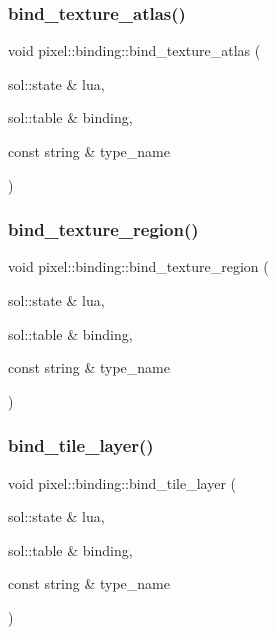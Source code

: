 \mbox{\label{namespacepixel_1_1binding_abb52911bc71cd248f5aa1f1749f850fe}} 
\subsubsection{\texorpdfstring{bind\+\_\+texture\+\_\+atlas()}{bind\_texture\_atlas()}}
{\footnotesize\ttfamily void pixel\+::binding\+::bind\+\_\+texture\+\_\+atlas (\begin{DoxyParamCaption}\item[{sol\+::state \&}]{lua,  }\item[{sol\+::table \&}]{binding,  }\item[{const string \&}]{type\+\_\+name }\end{DoxyParamCaption})}

\mbox{\label{namespacepixel_1_1binding_a2e79543c93630c2c32b2defd8ce6d90c}} 
\subsubsection{\texorpdfstring{bind\+\_\+texture\+\_\+region()}{bind\_texture\_region()}}
{\footnotesize\ttfamily void pixel\+::binding\+::bind\+\_\+texture\+\_\+region (\begin{DoxyParamCaption}\item[{sol\+::state \&}]{lua,  }\item[{sol\+::table \&}]{binding,  }\item[{const string \&}]{type\+\_\+name }\end{DoxyParamCaption})}

\mbox{\label{namespacepixel_1_1binding_a0ef36fda30c27f9e76a812a0eb2b0462}} 
\subsubsection{\texorpdfstring{bind\+\_\+tile\+\_\+layer()}{bind\_tile\_layer()}}
{\footnotesize\ttfamily void pixel\+::binding\+::bind\+\_\+tile\+\_\+layer (\begin{DoxyParamCaption}\item[{sol\+::state \&}]{lua,  }\item[{sol\+::table \&}]{binding,  }\item[{const string \&}]{type\+\_\+name }\end{DoxyParamCaption})}

